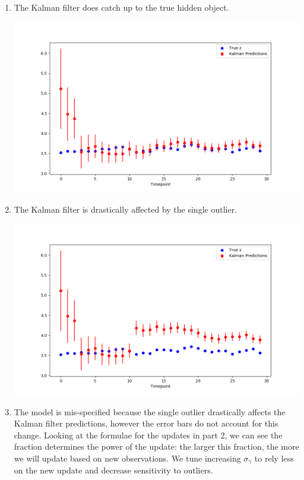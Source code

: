 \documentclass[submit]{harvardml}
\begin{document}
\begin{enumerate}
    \item
        The Kalman filter does catch up to the true hidden object. \\
        \begin{center}
            \includegraphics[scale=0.6]{kalman1.png}
        \end{center}
    \item
        The Kalman filter is drastically affected by the single outlier. \\
        \begin{center}
            \includegraphics[scale=0.6]{kalman2.png}
        \end{center}
    \item
        The model is mis-specified because the single outlier drastically
        affects the Kalman filter predictions, however the error bars do not
        account for this change. Looking at the formulae for the updates in
        part 2, we can see the fraction determines the power of the update: the
        larger this fraction, the more we will update based on new
        observations. We tune increasing $\sigma_\gamma$ to rely less on the
        new update and decrease sensitivity to outliers.
\end{enumerate}
\end{document}
